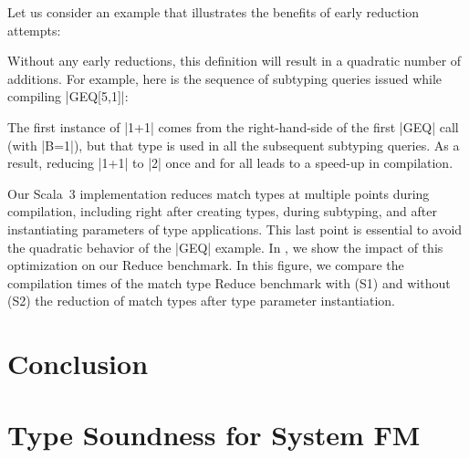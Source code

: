 Let us consider an example that illustrates the benefits of early reduction attempts:

\geqDefinition

\noindent
Without any early reductions, this definition will result in a quadratic number of additions. For example, here is the sequence of subtyping queries issued while compiling |GEQ[5,1]|:

\geqExample

\noindent
The first instance of |1+1| comes from the right-hand-side of the first |GEQ| call (with |B=1|), but that type is used in all the subsequent subtyping queries. As a result, reducing |1+1| to |2| once and for all leads to a speed-up in compilation.

Our Scala~3 implementation reduces match types at multiple points during compilation, including right after creating types, during subtyping, and after instantiating parameters of type applications.
This last point is essential to avoid the quadratic behavior of the |GEQ| example.
In , we show the impact of this optimization on our Reduce benchmark.
In this figure, we compare the compilation times of the match type Reduce benchmark with (S1) and without (S2) the reduction of match types after type parameter instantiation.


\chapter{Conclusion}
\label{chap:conclusion}
\lipsum[1]


\appendix
\chapter{Type Soundness for System FM}
\label{chap:type-soundness-for-system-fm}

\renewenvironment{proof}{{\it Proof: }}{\qed} %






